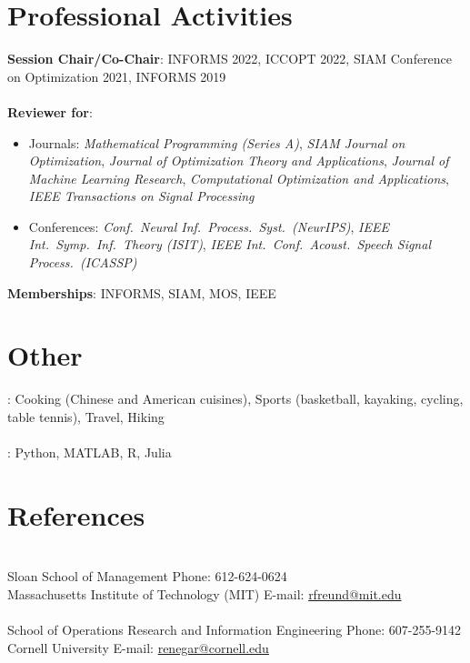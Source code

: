 \documentclass[11pt]{article}
\newcommand{\ICASSP}{IEEE Int.\ Conf.\ Acoust.\ Speech Signal Process.\ (ICASSP)}
\newcommand{\ISIT}{IEEE Int.\ Symp.\ Inf.\ Theory (ISIT)}
\newcommand{\TSP}{IEEE Transactions on Signal Processing}
\newcommand{\SIOPT}{SIAM Journal on Optimization}
\newcommand{\JMLR}{Journal of Machine Learning Research}
\newcommand{\MPA}{Mathematical Programming (Series A)}
\newcommand{\COA}{Computational Optimization and Applications}
\newcommand{\JOTA}{Journal of Optimization Theory and Applications}
\newcommand{\NIPS}{Conf.\ Neural Inf.\ Process.\ Syst.\ (NeurIPS)}
\begin{document}
    


\section*{Professional Activities}
{\noindent
{\bf Session Chair/Co-Chair}: INFORMS 2022, ICCOPT 2022, SIAM Conference on Optimization 2021, INFORMS 2019\\\\
{\bf Reviewer for}: 
\begin{itemize}
\item Journals: {\em \MPA}, {\em\SIOPT}, {\em\JOTA}, {\em\JMLR}, {\em\COA}, {\em\TSP}
\item Conferences: {\em\NIPS}, {\em\ISIT}, {\em\ICASSP}
\end{itemize}   %
\vspace{2ex}
{\bf Memberships}: INFORMS, SIAM, MOS, IEEE
}

\section*{Other}

: Cooking (Chinese and American cuisines), Sports (basketball, kayaking, cycling, table tennis), Travel, Hiking\\ \\
: Python, MATLAB, R, Julia


\section*{References}
  \\
 Sloan School of Management \hfill Phone: 612-624-0624\\
Massachusetts Institute of Technology (MIT) \hfill E-mail: \href{mailto:rfreund@mit.edu}{rfreund@mit.edu}
\\[3ex]


  \\
 School of Operations Research and Information Engineering \hfill Phone: 607-255-9142\\
Cornell University \hfill E-mail: \href{mailto:renegar@cornell.edu}{renegar@cornell.edu}
\\[3ex]
\end{document}
